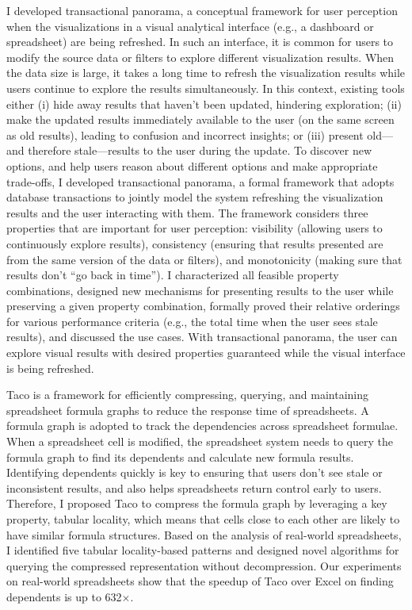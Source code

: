 \documentclass[10pt]{article} %
\begin{document}
{I developed transactional panorama, 
a conceptual framework for user perception when the visualizations 
in a visual analytical interface (e.g., a dashboard or spreadsheet) 
are being refreshed. In such an interface, it is common 
for users to modify the source data or filters 
to explore different visualization results. 
When the data size is large, it takes a long time to 
refresh the visualization results 
while users continue to explore the results simultaneously. 
In this context, existing tools either (i) hide away
results that haven't been updated, hindering exploration;
(ii) make the updated results immediately available to the user
(on the same screen as old results), leading to confusion 
and incorrect insights; or (iii) present old---and therefore 
stale---results to the user during the update. 
To discover new options, and help users reason about 
different options and make appropriate trade-offs, 
I developed transactional panorama, a formal framework 
that adopts database transactions to jointly model the system 
refreshing the visualization results and 
the user interacting with them.
The framework considers three properties that are important for 
user perception: visibility (allowing users to continuously 
explore results), consistency (ensuring that results 
presented are from the same version of the data or filters), 
and monotonicity (making sure that results 
don't ``go back in time''). 
I characterized all feasible property combinations, 
designed new mechanisms for presenting results 
to the user while preserving a given property combination, 
formally proved their relative orderings for various 
performance criteria (e.g., the total time when 
the user sees stale results), 
and discussed the use cases. 
With transactional panorama, the user can explore 
visual results with desired properties guaranteed 
while the visual interface is being refreshed.}

{Taco is a framework for efficiently compressing, querying, 
and maintaining spreadsheet formula graphs to reduce the response time of spreadsheets. 
A formula graph is adopted to track the dependencies across spreadsheet formulae. 
When a spreadsheet cell is modified, the spreadsheet system needs to query the formula graph 
to find its dependents and calculate new formula results. 
Identifying dependents quickly is key to ensuring that 
users don't see stale or inconsistent results, and also helps spreadsheets return control early to users. 
Therefore, I proposed Taco to compress the formula graph by leveraging a key property, tabular locality, 
which means that cells close to each other are likely to have similar formula structures. 
Based on the analysis of real-world spreadsheets, 
I identified five tabular locality-based patterns 
and designed novel algorithms for querying the compressed 
representation without decompression. 
Our experiments on real-world spreadsheets show 
that the speedup of Taco over Excel on finding dependents 
is up to 632$\times$.}
\end{document}
